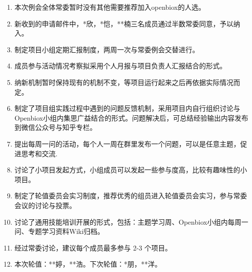 \documentclass[]{article}
\providecommand{\tightlist}{%
  \setlength{\itemsep}{0pt}\setlength{\parskip}{0pt}}
\begin{document}
\begin{enumerate}
\def\labelenumi{\arabic{enumi}.}
\tightlist
\item
  本次例会全体常委暂时没有其他需要推荐加入openbiox的人选。
\item
  新收到的申请邮件中，*欣，*恺，**楠三名成员通过半数常委同意，予以纳入。
\item
  制定项目小组定期汇报制度，两周一次与常委例会交替进行。
\item
  成员参与活动情况考察拟采用个人月报与项目负责人汇报结合的形式。
\item
  纳新机制暂时保持现有的机制不变，等项目运行起来之后再依据实际情况而定。
\item
  制定了项目组实践过程中遇到的问题反馈机制，采用项目内自行组织讨论与Openbiox小组内集思广益结合的形式。问题解决后，可总结经验输出内容发布到微信公众号与知乎专栏。
\item
  提出每周一问的活动，每个人一周在群里发布一个问题，可以是任意主题，促进思考和交流.
\item
  讨论了小项目发起方式，小组成员可以发起一些参与度高，比较有趣味性的小项目。
\item
  制定了轮值委员会实习制度，推荐优秀的组员进入轮值委员会实习，参与常委会议的讨论与投票。
\item
  讨论了通用技能培训开展的形式，包括：主题学习周、Openbiox小组内每周一问、专题学习资料Wiki归档。
\item
  经过常委讨论，建议每个成员最多参与 2-3 个项目。
\item
  本次轮值：**婷，**浩。下次轮值：*朋，**洋。
\end{enumerate}
\end{document}
